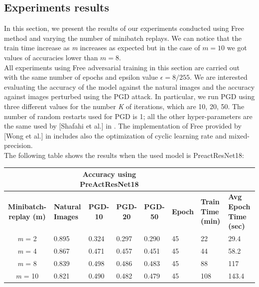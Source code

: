 \documentclass{article}
\begin{document}
\subsection{Experiments results}
In this section, we present the results of our experiments conducted using Free
method and varying the number of minibatch replays. We can notice that the train
time increase as \textit{m} increases as expected but in the case of $m=10$ we
got values of accuracies lower than $m=8$.\\
All experiments using Free adversarial training in this section are carried out
with the same number of epochs and epsilon value $\epsilon = 8/255$. We are
interested evaluating the accuracy of the model against the natural images and
the accuracy against images perturbed using the PGD attack. In particular, we
run PGD using three different values for the number \textit{K} of iterations,
which are {10, 20, 50}. The number of random restarts used for PGD is 1; all the
other hyper-parameters are the same used by [Shafahi et al.] in
\cite{ShafahiEtAl2019b}. The implementation of Free provided by [Wong et al.] in
\cite{WongEtAl2020} includes also the optimization of cyclic learning rate and
mixed-precision.\\
The following table shows the results when the used model is PreactResNet18:
\begin{table}[hbt!]
\begin{tabular}{|c|l|l|l|l|l|l|p{2cm}|}
\hline
\multicolumn{1}{|l|}{{ }}        & \multicolumn{4}{c|}{{ \textbf{Accuracy using
PreActResNet18}}}
& \multicolumn{3}{l|}{{ }}
\\ \hline
{ \textbf{Minibatch-replay (m)}} & \multicolumn{1}{p{1.5cm}|}{{ \textbf{Natural
Images}}} & \multicolumn{1}{c|}{{ \textbf{PGD-10}}} & \multicolumn{1}{c|}{{
\textbf{PGD-20}}} & \multicolumn{1}{c|}{{ \textbf{PGD-50}}} &
\multicolumn{1}{c|}{{ \textbf{Epoch}}} & \multicolumn{1}{p{1.5cm}|}{{
\textbf{Train Time (min)}}} & \multicolumn{1}{p{1.5cm}|}{{ \textbf{Avg Epoch
Time (sec)}}} \\ \hline
{ \textit{m} = 2}                & { 0.895}
& { 0.324}                                & { 0.297}
& { 0.290}                                & { 45}
& { 22 }                               & { 29.4 }
\\ \hline
{ \textit{m} = 4}                & { 0.867}
& { 0.471}                                & { 0.457}
& { 0.451}                                & { 45}
& { 44 }                               & { 58.2 }
\\ \hline
{ \textit{m} = 8}                & { 0.839}
& { 0.498}                                & { 0.486}
& { 0.483}                                & { 45}
& { 88 }                               & { 117 }
\\ \hline
{ \textit{m} = 10}               & { 0.821}
& { 0.490}                                & { 0.482}
& { 0.479}                                & { 45}
& { 108 }                              & { 143.4 }
\\ \hline
\end{tabular}
\end{table}
\end{document}
